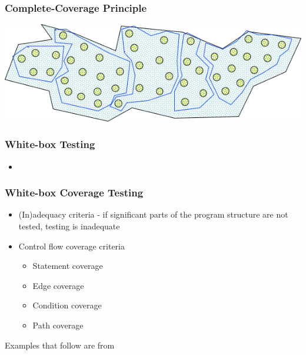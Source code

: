 \documentclass[t,12pt,numbers,fleqn]{beamer}
\begin{document}

\begin{frame}
\frametitle{Complete-Coverage Principle}

\includegraphics[scale=0.5]{../Figures/CompleteCoveragePrinciple.png}

\end{frame}


\begin{frame}
\frametitle{White-box Testing}

\begin{itemize}
\item {}
\end{itemize}

\end{frame}


\begin{frame}
\frametitle{White-box Coverage Testing}

\begin{itemize}
\item (In)adequacy criteria - if significant parts of the program structure are not tested, testing is inadequate
\item Control flow coverage criteria
\begin{itemize}
\item Statement coverage
\item Edge coverage
\item Condition coverage
\item Path coverage
\end{itemize}
\end{itemize}
Examples that follow are from \cite{GhezziEtAl2003}
\end{frame}
\end{document}
